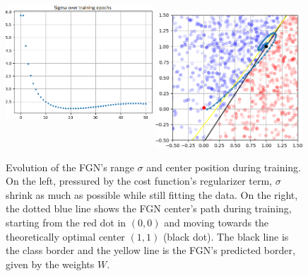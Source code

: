 \documentclass[12pt,oneside]{CUNY_PhD}
\begin{document}
\begin{figure}[!htbp]
    \centering
    \includegraphics[width=0.49\textwidth,height=6.35cm]{images/2D-single-neuron/2d-easy-sigma-training-cropped.png}
    \includegraphics[width=0.49\textwidth]{images/2D-single-neuron/2d-easy-center-path-cropped.png}
    \caption{Evolution of the FGN's range $\sigma$ and center position during training. On the left, pressured by the cost function's regularizer term, $\sigma$ shrink as much as possible while still fitting the data.  On the right, the dotted blue line shows the FGN center's path during training, starting from the red dot in $(0,0)$ and moving towards the theoretically optimal center $(1,1)$ (black dot). The black line is the class border and the yellow line is the FGN's predicted border, given by the weights $W$.}
    \label{fig:single-fgn-3}
\end{figure}
\end{document}
